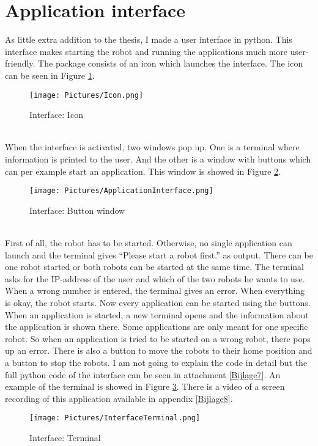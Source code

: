 \documentclass[11pt,a4paper]{report}
\begin{document}
\section{Application interface}\label{Interface}
As little extra addition to the thesis, I made a user interface in python. This interface makes starting the robot and running the applications much more user-friendly. The package consists of an icon which launches the interface. The icon can be seen in Figure \ref{fig:Icon}.
\begin{figure}[!ht]
	\centering
	\texttt{[image: Pictures/Icon.png]}
	\caption{Interface: Icon}
	\label{fig:Icon}
\end{figure}
\\
When the interface is activated, two windows pop up. One is a terminal where information is printed to the user. And the other is a window with buttons which can per example start an application. This window is showed in Figure \ref{fig:Interface}.
\begin{figure}[!ht]
	\centering
	\texttt{[image: Pictures/ApplicationInterface.png]}
	\caption{Interface: Button window}
	\label{fig:Interface}
\end{figure}
\\
First of all, the robot has to be started. Otherwise, no single application can launch and the terminal gives ``Please start a robot first.'' as output. There can be one robot started or both robots can be started at the same time. The terminal asks for the IP-address of the user and which of the two robots he wants to use. When a wrong number is entered, the terminal gives an error. When everything is okay, the robot starts. Now every application can be started using the buttons. When an application is started, a new terminal opens and the information about the application is shown there. Some applications are only meant for one specific robot. So when an application is tried to be started on a wrong robot, there pops up an error. There is also a button to move the robots to their home position and a button to stop the robots. I am not going to explain the code in detail but the full python code of the interface can be seen in attachment \ref{Bijlage7}. An example of the terminal is showed in Figure \ref{fig:InterfaceTerminal}. There is a video of a screen recording of this application available in appendix \ref{Bijlage8}.
\newpage
\begin{figure}[!ht]
	\centering
	\texttt{[image: Pictures/InterfaceTerminal.png]}
	\caption{Interface: Terminal}
	\label{fig:InterfaceTerminal}
\end{figure}
\end{document}

